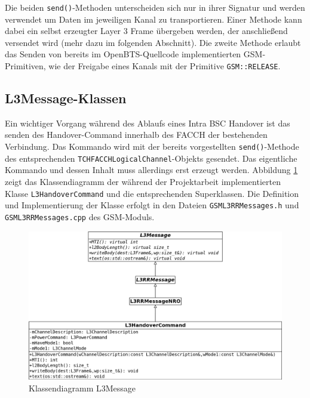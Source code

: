 Die beiden \lstinline{send()}-Methoden unterscheiden sich nur in ihrer Signatur und werden verwendet um Daten im jeweiligen Kanal zu transportieren. Einer Methode kann dabei ein selbst erzeugter Layer 3 Frame übergeben werden, der anschließend versendet wird (mehr dazu im folgenden Abschnitt). Die zweite Methode erlaubt das Senden von bereits im OpenBTS-Quellcode implementierten GSM-Primitiven, wie der Freigabe eines Kanals mit der Primitive \lstinline{GSM::RELEASE}.

\subsection{L3Message-Klassen}

Ein wichtiger Vorgang während des Ablaufs eines Intra BSC Handover ist das senden des Handover-Command innerhalb des FACCH der bestehenden Verbindung. Das Kommando wird mit der bereits vorgestellten \lstinline{send()}-Methode des entsprechenden \lstinline{TCHFACCHLogicalChannel}-Objekts gesendet. Das eigentliche Kommando und dessen Inhalt muss allerdings erst erzeugt werden. Abbildung \ref{fig:l3mess} zeigt das Klassendiagramm der während der Projektarbeit implementierten Klasse \lstinline{L3HandoverCommand} und die entsprechenden Superklassen. Die Definition und Implementierung der Klasse erfolgt in den Dateien \lstinline{GSML3RRMessages.h} und \lstinline{GSML3RRMessages.cpp} des GSM-Moduls.

\begin{figure}[h!]
  \centering
  \includegraphics[width=\textwidth]{img/l3m}
  \caption{Klassendiagramm L3Message}
  \label{fig:l3mess}
\end{figure}

